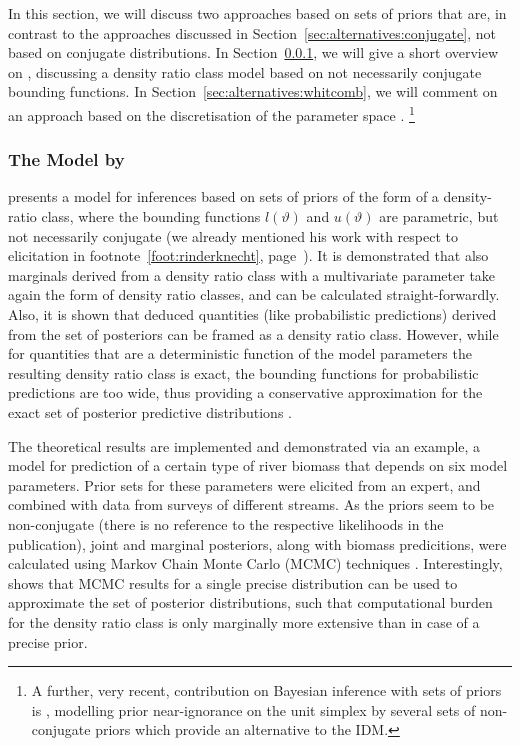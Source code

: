 In this section, we will discuss two approaches based on sets of priors that are,
in contrast to the approaches discussed in Section~\ref{sec:alternatives:conjugate},
not based on conjugate distributions.
In Section~\ref{sec:alternatives:rinderknecht}, we
will give a short overview on \textcite[\S 4]{2011:rinderknecht:diss},
discussing a density ratio class model based on not necessarily conjugate bounding functions.
In Section~\ref{sec:alternatives:whitcomb}, we will comment on an approach based on the discretisation of the parameter space
\parencite{2005:whitcomb}.%
\footnote{A further, very recent, contribution on Bayesian inference with sets of priors
is \textcite{2013:mangilibenavoli}, modelling prior near-ignorance on the unit simplex
by several sets of non-conjugate priors which provide an alternative to the IDM.}

\subsubsection{The Model by \texorpdfstring{\textcite{2011:rinderknecht:diss}}{Rinderknecht (2011)}}
\label{sec:alternatives:rinderknecht}

\textcite[\S 4]{2011:rinderknecht:diss} presents a model for inferences 
based on sets of priors of the form of a density-ratio class,
where the bounding functions $l(\vartheta)$ and $u(\vartheta)$ are parametric, but not necessarily conjugate
(we already mentioned his work with respect to elicitation in footnote~\ref{foot:rinderknecht}, page~\pageref{foot:rinderknecht}).
It is demonstrated that also marginals derived from a density ratio class with a multivariate parameter
take again the form of density ratio classes, and can be calculated straight-forwardly.
Also, it is shown that deduced quantities (like probabilistic predictions) derived from the set of posteriors
can be framed as a density ratio class.
However, while for quantities that are a deterministic function of the model parameters
the resulting density ratio class is exact, the bounding functions %
for probabilistic predictions are too wide, thus providing a conservative approximation for
the exact set of posterior predictive distributions \parencite[\S 4.2.4]{2011:rinderknecht:diss}.

The theoretical results are implemented and demonstrated via an example,
a model for prediction of a certain type of river biomass that depends on six model parameters.
Prior sets for these parameters were elicited from an expert,
and combined with data from surveys of different streams.
As the priors seem to be non-conjugate (there is no reference to the respective likelihoods in the publication),
joint and marginal posteriors, along with biomass predicitions, were calculated using
Markov Chain Monte Carlo (MCMC) techniques \parencite[see, e.g.,][]{1998:gilks}.
Interestingly, \textcite[\S 4.3]{2011:rinderknecht:diss} shows that
MCMC results for a single precise distribution can be used to approximate the set of posterior distributions,
such that computational burden for the density ratio class is only marginally more extensive than in case of a precise prior.

